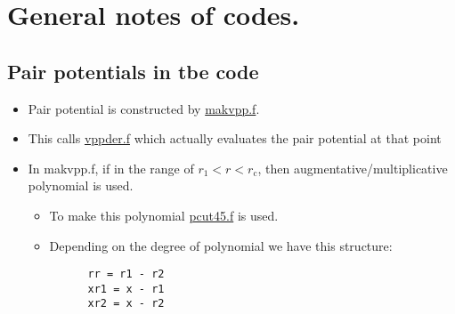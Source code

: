 \documentclass[11pt]{article}
\begin{document}
\section{General notes of codes.}
\label{sec-2}

\subsection{Pair potentials in tbe code}
\label{sec-2-1}
\begin{itemize}
\item Pair potential is constructed by \href{file:///home/tigany/lm/tb/makvpp.f}{makvpp.f}.
\item This calls \href{file:///home/tigany/lm/tb/vppder.f}{vppder.f} which actually evaluates the pair potential at that
point
\item In makvpp.f, if in the range of $r_1 < r < r_{\text{c}}$, then
augmentative/multiplicative polynomial is used.
\begin{itemize}
\item To make this polynomial \href{file:///home/tigany/lm/tb/pcut45.f}{pcut45.f} is used.
\item Depending on the degree of polynomial we have this structure:
\begin{verbatim}
      rr = r1 - r2
      xr1 = x - r1
      xr2 = x - r2


\end{verbatim}
\end{itemize}
\end{itemize}
\end{document}
